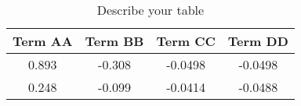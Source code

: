 %
%
\begin{center}
    \begin{table}[h]
    \captionsetup{belowskip=-25pt}  %
    \small
        \centering
        \begin{tabular}{|cccc|}
             Term AA & Term BB & Term CC & Term DD  \\
             \hline
                0.893 & -0.308 & -0.0498 & -0.0498 \\
                0.248 & -0.099 & -0.0414 & -0.0488 \\
        \end{tabular}
        \caption{Describe your table}
        \label{tab:1}
    \end{table}
\end{center}